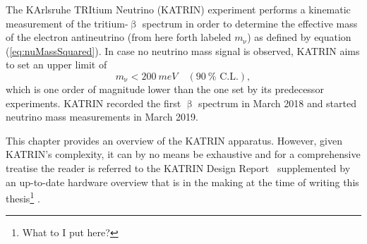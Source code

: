 The KArlsruhe TRItium Neutrino (KATRIN) experiment performs a kinematic measurement of the tritium-$\upbeta$ spectrum in order to determine the effective mass of the electron antineutrino (from here forth labeled $m_\upnu$) as defined by equation (\ref{eq:nuMassSquared}). In case no neutrino mass signal is observed, KATRIN aims to set an upper limit of
\begin{equation*}
m_\upnu < \SI{200}{meV} \quad (\SI{90}{\percent} \text{ C.L.})
\comma
\end{equation*}
which is one order of magnitude lower than the one set by its predecessor experiments.
KATRIN recorded the first $\upbeta$ spectrum in March 2018 and started neutrino mass measurements in March 2019.

This chapter provides an overview of the KATRIN apparatus. However, given KATRIN's complexity, it can by no means be exhaustive and for a comprehensive treatise the reader is referred to the KATRIN Design Report~\cite{Angrik:2005ep} supplemented by an up-to-date hardware overview that is in the making at the time of writing this thesis\footnote{What to I put here?} .